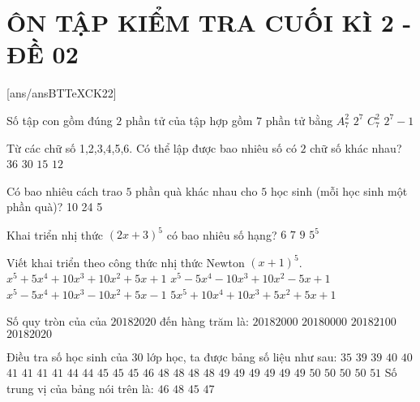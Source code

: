 \section*{ÔN TẬP KIỂM TRA CUỐI KÌ 2 - ĐỀ 02}
\setcounter{ex}{0}\setcounter{bt}{0}
[ans/ansBTTeXCK22]
\begin{ex}
 Số tập con gồm đúng $2$ phần tử của tập hợp gồm $7$ phần tử bằng
\choice
{$A_7^2$}
{$2^7$}
{\True $C_7^2$}
{$2^7-1$}
\end{ex}
\begin{ex}
 Từ các chữ số 1,2,3,4,5,6. Có thể lập được bao nhiêu số có $2$ chữ số khác nhau?
\choice
{$36$}
{\True $30$}
{$15$}
{$12$}
\end{ex}
\begin{ex}
 Có bao nhiêu cách trao $5$ phần quà khác nhau cho $5$ học sinh (mỗi học sinh một phần quà)?
\choice
{10}
{24}
{5}
{}
\end{ex}
\begin{ex}
 Khai triển nhị thức $(2x+3)^5$ có bao nhiêu số hạng?
\choice
{\True $6$}
{$7$}
{$9$}
{${5^{5}}$}
\end{ex}
\begin{ex}
Viết khai triển theo công thức nhị thức Newton ${{(x+1)}^5}$.
\choice
{\True $x^5+5x^4+10x^3+10x^2+5x+1$}
{$x^5-5x^4-10x^3+10x^2-5x+1$}
{$x^5-5x^4+10x^3-10x^2+5x-1$}
{$5x^5+10x^4+10x^3+5x^2+5x+1$}
\end{ex}
\begin{ex}
Số quy tròn của của $20182020$ đến hàng trăm là:
\choice
{\True $20182000$}
{$20180000$}
{$20182100$}
{$20182020$}
\end{ex}
\begin{ex}
 Điều tra số học sinh của $30$ lớp học, ta được bảng số liệu như sau: 
$35$ $39$ $39$ $40$ $40$ $41$ $41$ $41$ $41$ $44$ $44$ $45$ $45$ $45$ $46$
$48$ $48$ $48$ $48$ $49$ $49$ $49$ $49$ $49$ $49$ $50$ $50$ $50$ $50$ $51$
 Số trung vị của bảng nói trên là:
\choice
{$46$}
{$48$}
{$45$}
{\True $47$}
\end{ex}
